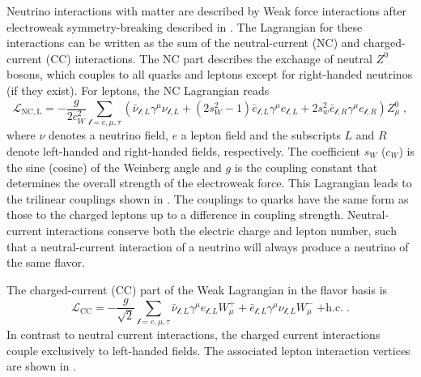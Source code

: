 Neutrino interactions with matter are described by Weak force interactions after electroweak symmetry-breaking described in .
The Lagrangian for these interactions can be written as the sum of the neutral-current (NC) and charged-current (CC) interactions.
The NC part describes the exchange of neutral $Z^0$ bosons, which couples to all quarks and leptons except for right-handed neutrinos (if they exist).
For leptons, the NC Lagrangian reads
\begin{equation}
  \mathcal{L}_\mathrm{NC,L} = -\frac{g}{2 c_W^2} \sum_{\mathcal{l}=e,\mu,\tau} (\bar{\nu}_{\mathcal{l}, L} \gamma^\mu \nu_{\mathcal{l}, L} + (2 s_W^2 - 1) \bar{e}_{\mathcal{l}, L} \gamma^\mu e_{\mathcal{l}, L} + 2s_w^2 \bar{e}_{\mathcal{l}, R} \gamma^\mu e_{\mathcal{l}, R}) Z^0_\mu\;, \label{eq:ew-nc-lagrangian}
\end{equation}
where $\nu$ denotes a neutrino field, $e$ a lepton field and the subscripts $L$ and $R$ denote left-handed and right-handed fields, respectively.
The coefficient $s_W$ ($c_W$) is the sine (cosine) of the Weinberg angle and $g$ is the coupling constant that determines the overall strength of the electroweak force.
This Lagrangian leads to the trilinear couplings shown in .
The couplings to quarks have the same form as those to the charged leptons up to a difference in coupling strength.
Neutral-current interactions conserve both the electric charge and lepton number, such that a neutral-current interaction of a neutrino will always produce a neutrino of the same flavor.

The charged-current (CC) part of the Weak Lagrangian in the flavor basis is
\begin{equation}
    \mathcal{L}_\mathrm{CC} = -\frac{g}{\sqrt{2}} \sum_{\mathcal{l}=e,\mu,\tau} \bar{\nu}_{\mathcal{l},L} \gamma^\mu e_{\mathcal{l},L} W^+_\mu + \bar{e}_{\mathcal{l},L} \gamma^\mu \nu_{\mathcal{l},L} W^-_\mu\;\mathrm{+h.c.}\;.\label{eq:ew-cc-lagrangian}
\end{equation}
In contrast to neutral current interactions, the charged current interactions couple exclusively to left-handed fields.
The associated lepton interaction vertices are shown in .


